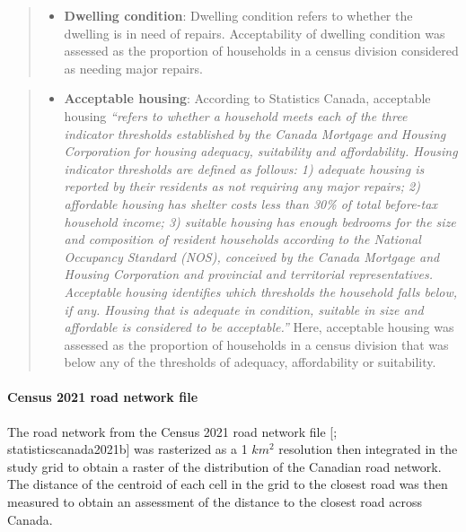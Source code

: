 \documentclass[preprint, 3p,
authoryear]{elsarticle} %
\providecommand{\tightlist}{%
  \setlength{\itemsep}{0pt}\setlength{\parskip}{0pt}}
\begin{document}
\begin{quote}
\begin{itemize}
\tightlist
\item
  \textbf{Dwelling condition}: Dwelling condition refers to whether the
  dwelling is in need of repairs. Acceptability of dwelling condition
  was assessed as the proportion of households in a census division
  considered as needing major repairs.
\end{itemize}
\end{quote}

\begin{quote}
\begin{itemize}
\tightlist
\item
  \textbf{Acceptable housing}: According to Statistics Canada,
  acceptable housing \emph{``refers to whether a household meets each of
  the three indicator thresholds established by the Canada Mortgage and
  Housing Corporation for housing adequacy, suitability and
  affordability. Housing indicator thresholds are defined as follows: 1)
  adequate housing is reported by their residents as not requiring any
  major repairs; 2) affordable housing has shelter costs less than 30\%
  of total before-tax household income; 3) suitable housing has enough
  bedrooms for the size and composition of resident households according
  to the National Occupancy Standard (NOS), conceived by the Canada
  Mortgage and Housing Corporation and provincial and territorial
  representatives. Acceptable housing identifies which thresholds the
  household falls below, if any. Housing that is adequate in condition,
  suitable in size and affordable is considered to be acceptable.''}
  Here, acceptable housing was assessed as the proportion of households
  in a census division that was below any of the thresholds of adequacy,
  affordability or suitability.
\end{itemize}
\end{quote}

\hypertarget{census-2021-road-network-file}{%
\paragraph{Census 2021 road network
file}\label{census-2021-road-network-file}}

The road network from the Census 2021 road network file
{[}\citet{statisticscanada2021a}; statisticscanada2021b{]} was
rasterized as a 1 \(km^2\) resolution then integrated in the study grid
to obtain a raster of the distribution of the Canadian road network. The
distance of the centroid of each cell in the grid to the closest road
was then measured to obtain an assessment of the distance to the closest
road across Canada.
\end{document}
